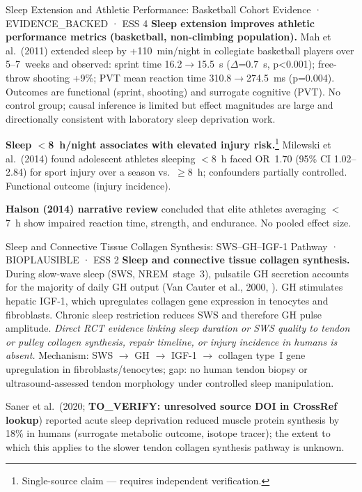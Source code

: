 \begin{evidencebox}{Sleep Extension and Athletic Performance: Basketball Cohort Evidence · EVIDENCE\_BACKED · ESS 4}
\textbf{Sleep extension improves athletic performance metrics (basketball, non-climbing population).} Mah et al.\ (2011) extended sleep by +110~min/night in collegiate basketball players over 5--7~weeks and observed: sprint time 16.2$\to$15.5~s ($\Delta$=0.7~s, p<0.001); free-throw shooting +9\%; PVT mean reaction time 310.8$\to$274.5~ms (p=0.004). Outcomes are functional (sprint, shooting) and surrogate cognitive (PVT). No control group; causal inference is limited but effect magnitudes are large and directionally consistent with laboratory sleep deprivation work. \cite{MMKD11}

\textbf{Sleep $<$8~h/night associates with elevated injury risk.}\footnote{Single-source claim --- requires independent verification.} Milewski et al.\ (2014) found adolescent athletes sleeping $<$8~h faced OR~1.70 (95\% CI 1.02--2.84) for sport injury over a season vs.\ $\geq$8~h; confounders partially controlled. Functional outcome (injury incidence). \cite{MSBE14}

\textbf{Halson (2014) narrative review} concluded that elite athletes averaging $<$7~h show impaired reaction time, strength, and endurance. No pooled effect size. \cite{HAL14}
\end{evidencebox}

\begin{bioplausbox}{Sleep and Connective Tissue Collagen Synthesis: SWS--GH--IGF-1 Pathway · BIOPLAUSIBLE · ESS 2}
\textbf{Sleep and connective tissue collagen synthesis.} During slow-wave sleep (SWS, NREM~stage~3), pulsatile GH secretion accounts for the majority of daily GH output (Van Cauter et al., 2000, \cite{VAN00}). GH stimulates hepatic IGF-1, which upregulates collagen gene expression in tenocytes and fibroblasts. Chronic sleep restriction reduces SWS and therefore GH pulse amplitude. \emph{Direct RCT evidence linking sleep duration or SWS quality to tendon or pulley collagen synthesis, repair timeline, or injury incidence in humans is absent.} Mechanism: SWS $\to$ GH $\to$ IGF-1 $\to$ collagen type~I gene upregulation in fibroblasts/tenocytes; gap: no human tendon biopsy or ultrasound-assessed tendon morphology under controlled sleep manipulation.

Saner et al.\ (2020; \textbf{TO\_VERIFY: unresolved source DOI in CrossRef lookup}) reported acute sleep deprivation reduced muscle protein synthesis by 18\% in humans (surrogate metabolic outcome, isotope tracer); the extent to which this applies to the slower tendon collagen synthesis pathway is unknown.
\end{bioplausbox}

